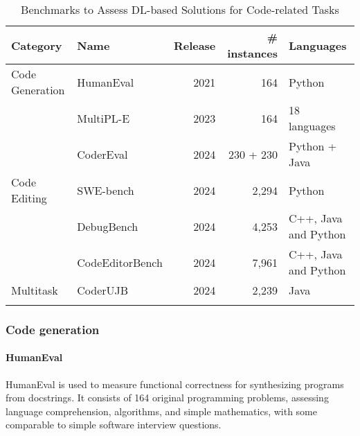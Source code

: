 \begin{table}[ht]
    \centering
    \begin{tabular}{llrrl}
        \toprule
        \textbf{Category}     &
        \textbf{Name}         &
        \textbf{Release}      &
        \textbf{\# instances} &
        \textbf{Languages}                                                                                              \\
        \midrule
        Code Generation       & HumanEval \cite{chen2021}                     & 2021 & 164       & Python               \\
                              & MultiPL-E \cite{cassano2022}                  & 2023 & 164       & 18 languages         \\
                              & CoderEval \cite{Zhang_2024}                   & 2024 & 230 + 230 & Python + Java        \\
        \arrayrulecolor{lightgray}\hline
        Code Editing          & SWE-bench \cite{jimenez2024swebench}          & 2024 & 2,294     & Python               \\
                              & DebugBench \cite{tian2024debugbench}          & 2024 & 4,253     & C++, Java and Python \\
                              & CodeEditorBench \cite{guo2024codeeditorbench} & 2024 & 7,961     & C++, Java and Python \\
        \arrayrulecolor{lightgray}\hline
        Multitask             & CoderUJB \cite{zeng2024coderujb}              & 2024 & 2,239     & Java                 \\
        \arrayrulecolor{black}\bottomrule
    \end{tabular}
    \caption{Benchmarks to Assess DL-based Solutions for Code-related Tasks}\label{tab:benchs}
\end{table}

\subsubsection{Code generation}

\paragraph{HumanEval \cite{chen2021}}
HumanEval is used to measure functional correctness for synthesizing programs from
docstrings. It consists of 164 original programming problems, assessing
language comprehension, algorithms, and simple mathematics, with some
comparable to simple software interview questions.

